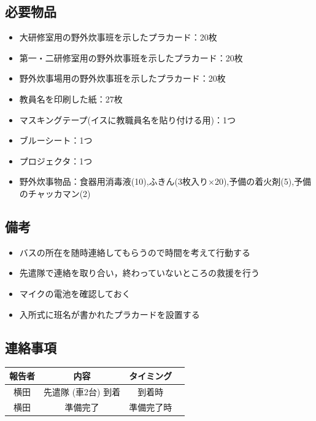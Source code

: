 \subsection{必要物品}
\begin{itemize}
\item 大研修室用の野外炊事班を示したプラカード：20枚
\item 第一・二研修室用の野外炊事班を示したプラカード：20枚
\item 野外炊事場用の野外炊事班を示したプラカード：20枚
\item 教員名を印刷した紙：27枚
\item マスキングテープ(イスに教職員名を貼り付ける用)：1つ
\item ブルーシート：1つ
\item プロジェクタ：1つ
\item 野外炊事物品：食器用消毒液(10),ふきん(3枚入り×20),予備の着火剤(5),予備のチャッカマン(2)
\end{itemize}


\subsection{備考}
\begin{itemize}
\item バスの所在を随時連絡してもらうので時間を考えて行動する
\item 先遣隊で連絡を取り合い，終わっていないところの救援を行う
\item マイクの電池を確認しておく
\item 入所式に班名が書かれたプラカードを設置する
\end{itemize}


\subsection{連絡事項}
\begin{table}[h]
\begin{tabular}{|c|c|c|c|}
\hline
報告者 & 内容 & タイミング \\ \hline \hline
横田 & 先遣隊 (車2台) 到着 & 到着時\\ \hline
横田 & 準備完了 & 準備完了時 \\ \hline
\end{tabular}
\end{table}

%

